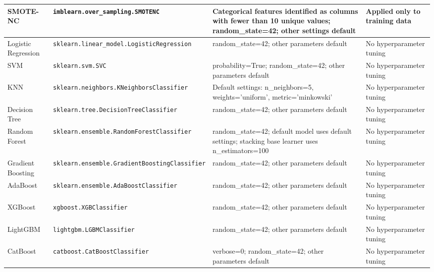 \documentclass[a4paper,fleqn]{cas-sc}
\begin{document}
{\begin{longtable}{p{2cm} p{7.75cm} p{3cm} p{2.25cm}}
SMOTE-NC 
& \texttt{imblearn.over\_sampling.SMOTENC} 
& Categorical features identified as columns with fewer than 10 unique values; random\_state=42; other settings default 
& Applied only to training data \\ 
\midrule

Logistic Regression 
& \texttt{sklearn.linear\_model.LogisticRegression} 
& random\_state=42; other parameters default 
& No hyperparameter tuning \\ 
\midrule

SVM 
& \texttt{sklearn.svm.SVC} 
& probability=True; random\_state=42; other parameters default 
& No hyperparameter tuning \\ 
\midrule

KNN 
& \texttt{sklearn.neighbors.KNeighborsClassifier} 
& Default settings: n\_neighbors=5, weights='uniform', metric='minkowski' 
& No hyperparameter tuning \\ 
\midrule

Decision Tree 
& \texttt{sklearn.tree.DecisionTreeClassifier} 
& random\_state=42; other parameters default 
& No hyperparameter tuning \\ 
\midrule

Random Forest 
& \texttt{sklearn.ensemble.RandomForestClassifier} 
& random\_state=42; default model uses default settings; stacking base learner uses n\_estimators=100 
& No hyperparameter tuning \\ 
\midrule

Gradient Boosting 
& \texttt{sklearn.ensemble.GradientBoostingClassifier} 
& random\_state=42; other parameters default 
& No hyperparameter tuning \\ 
\midrule

AdaBoost 
& \texttt{sklearn.ensemble.AdaBoostClassifier} 
& random\_state=42; other parameters default 
& No hyperparameter tuning \\ 
\midrule

XGBoost 
& \texttt{xgboost.XGBClassifier} 
& random\_state=42; other parameters default 
& No hyperparameter tuning \\ 
\midrule

LightGBM 
& \texttt{lightgbm.LGBMClassifier} 
& random\_state=42; other parameters default 
& No hyperparameter tuning \\ 
\midrule

CatBoost 
& \texttt{catboost.CatBoostClassifier} 
& verbose=0; random\_state=42; other parameters default 
& No hyperparameter tuning \\ 
\midrule


\end{longtable}}
\end{document}
